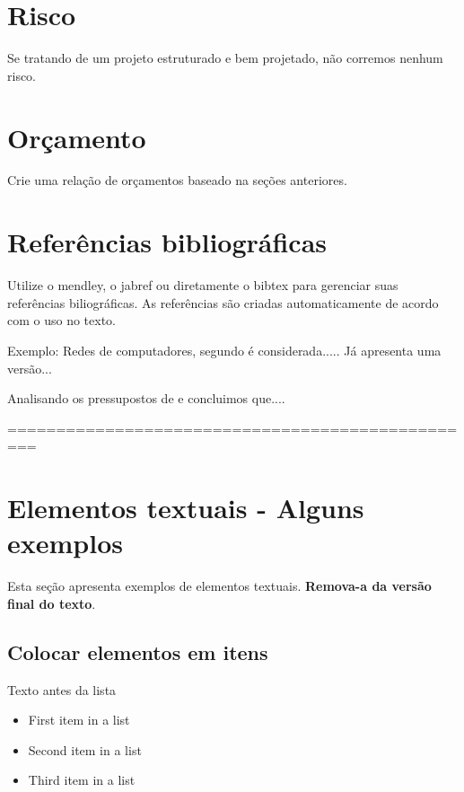 \documentclass[	DIV=calc,%
							paper=a4,%
							fontsize=12pt,%
							onecolumn]{scrartcl}	 					%
\begin{document}
\section{Risco}
Se tratando de um projeto estruturado e bem projetado, não corremos nenhum risco. 

\section{Orçamento}
Crie uma relação de orçamentos baseado na seções anteriores.


\section{Referências bibliográficas}
Utilize o mendley, o jabref ou diretamente o bibtex para gerenciar suas referências biliográficas. As referências são criadas automaticamente de acordo com o uso no texto.

Exemplo: Redes de computadores, segundo \cite{t2013} é considerada..... Já \cite{kurose2010} apresenta uma versão...

Analisando os pressupostos de \cite{ref3} e \cite{ref4} concluimos que....


\renewcommand\refname{} %

  

=================================================
\section{Elementos textuais - Alguns exemplos}

Esta seção apresenta exemplos de elementos textuais. \textbf{Remova-a da versão final do texto}.


\subsection{Colocar elementos em itens}

Texto antes da lista

\begin{itemize}
	\item First item in a list 
	\item Second item in a list 
	\item Third item in a list
\end{itemize}
\end{document}
